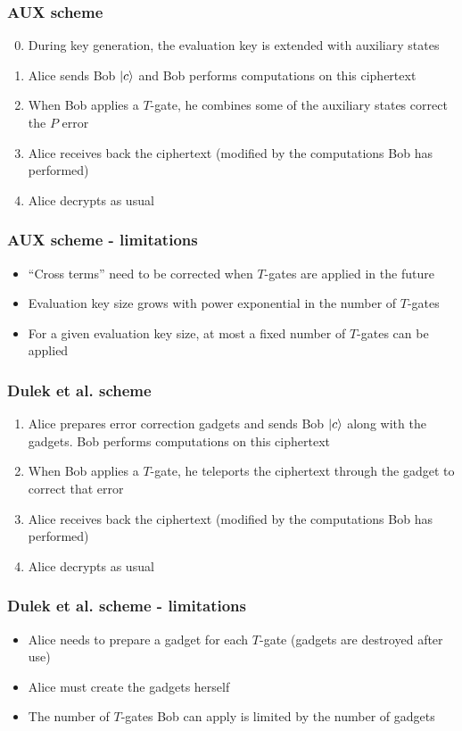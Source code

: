  
 \begin{frame}
 \frametitle{AUX scheme}
 \begin{enumerate}
   \setcounter{enumi}{-1}
   \item During key generation, the evaluation key is extended with auxiliary states
   \item Alice sends Bob $\left\vert{c}\right\rangle$ and Bob performs computations on this ciphertext
   \item When Bob applies a $T$-gate, he combines some of the auxiliary states correct the $P$ error
   \item Alice receives back the ciphertext (modified by the computations Bob has performed) 
   \item Alice decrypts as usual
\end{enumerate}
 \end{frame}
 
  \begin{frame}
\frametitle{AUX scheme - limitations}
\begin{itemize}
  \item ``Cross terms'' need to be corrected when $T$-gates are applied in the future
  \item Evaluation key size grows with power exponential in the number of $T$-gates
  \item For a given evaluation key size, at most a fixed number of $T$-gates can be applied
\end{itemize}
\end{frame}
 
  \begin{frame}
 \frametitle{Dulek et al. scheme}
 \begin{enumerate}
   \item Alice prepares error correction gadgets and sends Bob $\left\vert{c}\right\rangle$ along with the gadgets. Bob performs computations on this ciphertext
   \item When Bob applies a $T$-gate, he teleports the ciphertext through the gadget to correct that error
   \item Alice receives back the ciphertext (modified by the computations Bob has performed)
   \item Alice decrypts as usual
\end{enumerate}
 \end{frame}
 
   \begin{frame}
\frametitle{Dulek et al. scheme - limitations}
\begin{itemize}
  \item Alice needs to prepare a gadget for each $T$-gate (gadgets are destroyed after use)
  \item Alice must create the gadgets herself 
  \item The number of $T$-gates Bob can apply is limited by the number of gadgets
\end{itemize}
\end{frame}
 

